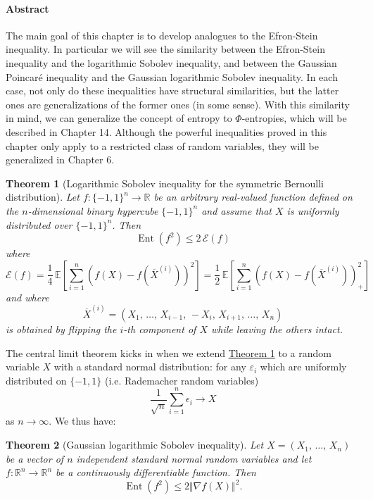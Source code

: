 \documentclass{amsproc}
\newtheorem{theorem}{Theorem}
\newcommand{\fref}[2]{\hyperref[#2]{#1 \ref*{#2}}}
\newcommand{\R}{\mathbb{R}}
\newcommand{\Rn}{\mathbb{R}^n}
\newcommand{\E}{\mathbb{E}} %
\DeclareMathOperator{\Ent}{Ent} %
\begin{document}
\paragraph{\textbf{Abstract}}
	The main goal of this chapter is to develop analogues to the Efron-Stein inequality.
	In particular we will see the similarity between the Efron-Stein inequality and the logarithmic Sobolev inequality,
	and between the Gaussian Poincar\'{e} inequality and the Gaussian logarithmic Sobolev inequality.
	In each case, not only do these inequalities have structural similarities, but the latter ones are generalizations of the former ones (in some sense).
	With this similarity in mind, we can generalize the concept of entropy to $\Phi$-entropies, which will be described in Chapter 14.
	Although the powerful inequalities proved in this chapter only apply to a restricted class of random variables, they will be generalized in Chapter 6.

\begin{theorem}[Logarithmic Sobolev inequality for the symmetric Bernoulli distribution]
\label{thm:log_Sob_ineq_sym_Bernoulli}
	Let $f:{\{-1,1\}}^n \rightarrow \R$ be an arbitrary real-valued function defined on the $n$-dimensional binary hypercube ${\{-1,1\}}^n$
	and assume that $X$ is uniformly distributed over ${\{-1,1\}}^n$. Then 
	$$ \Ent(f^2) \leq 2\,\mathcal{E}(f)$$
	where $$\mathcal{E}(f) = \frac{1}{4}\,\E\left[\sum_{i=1}^n \left(f(X)-f(\overline{X}^{(i)})\right)^2\right]
	= \frac{1}{2}\,\E\left[\sum_{i=1}^n \left(f(X)-f(\overline{X}^{(i)})\right)^2_+\right]$$
	and where $$\overline{X}^{(i)} = (X_1,\,\dots,\,X_{i-1},\,-X_i,\,X_{i+1},\,\dots,\,X_n)$$ is obtained by flipping the $i$-th component of $X$ while leaving the others intact.
\end{theorem}

	The central limit theorem kicks in when we extend \fref{Theorem}{thm:log_Sob_ineq_sym_Bernoulli} to a random variable $X$ with a standard normal distribution: 
	for any $\varepsilon_i$ which are uniformly distributed on $\{-1,1\}$ (i.e. Rademacher random variables)
	$$\frac{1}{\sqrt{n}}\sum_{i=1}^n \epsilon_i\rightarrow X$$
	as $n\to\infty$. We thus have:

\begin{theorem}[Gaussian logarithmic Sobolev inequality]
\label{thm:Gaussian_log_Sob_ineq}
	Let $X=(X_1,\,\dots,\,X_n)$ be a vector of $n$ independent standard normal random variables and let $f:\Rn \to \Rn$ be a continuously differentiable function. Then
	$$ \Ent(f^2) \leq 2\Vert \nabla f(X) \Vert^2.$$
\end{theorem}
\end{document}
